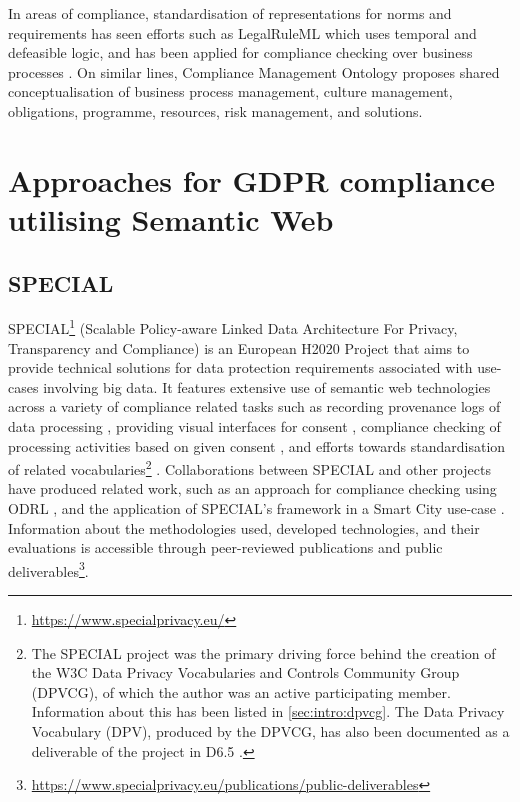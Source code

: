 In areas of compliance, standardisation of representations for norms and requirements has seen efforts such as LegalRuleML \cite{palmirani_legalruleml:_2011} which uses temporal and defeasible logic, and has been applied for compliance checking over business processes \cite{governatori_semantic_2016}. On similar lines, Compliance Management Ontology \cite{syed_abdullah_compliance_2012} proposes shared conceptualisation of business process management, culture management, obligations, programme, resources, risk management, and solutions.

\section{Approaches for GDPR compliance utilising Semantic Web}\label{sec:sota:gdpr-semweb}

\subsection{SPECIAL}
SPECIAL\footnote{\url{https://www.specialprivacy.eu/}} (Scalable Policy-aware Linked Data Architecture For Privacy, Transparency and Compliance) is an European H2020 Project that aims to provide technical solutions for data protection requirements associated with use-cases involving big data. It features extensive use of semantic web technologies across a variety of compliance related tasks such as recording provenance logs of data processing \cite{kirrane_scalable_2018}, providing visual interfaces for consent \cite{drozd_consent_nodate,gritzalis_i_2019}, compliance checking of processing activities based on given consent \cite{westphal_spirit:_nodate,vos_odrl_2019,fernandez_user_2019}, and efforts towards standardisation of related vocabularies\footnote{The SPECIAL project was the primary driving force behind the creation of the W3C Data Privacy Vocabularies and Controls Community Group (DPVCG), of which the author was an active participating member. Information about this has been listed in \autoref{sec:intro:dpvcg}. The Data Privacy Vocabulary (DPV), produced by the DPVCG, has also been documented as a deliverable of the project in D6.5 \cite{pandit_d6.5_2019}.} \cite{bonatti_data_2018,pandit_creating_2019}.
Collaborations between SPECIAL and other projects have produced related work, such as an approach for compliance checking using ODRL \cite{agarwal_legislative_2018,vos_odrl_2019}, and the application of SPECIAL's framework in a Smart City use-case \cite{fernandez_user_2019}.
Information about the methodologies used, developed technologies, and their evaluations is accessible through peer-reviewed publications and public deliverables\footnote{\url{https://www.specialprivacy.eu/publications/public-deliverables}}.


